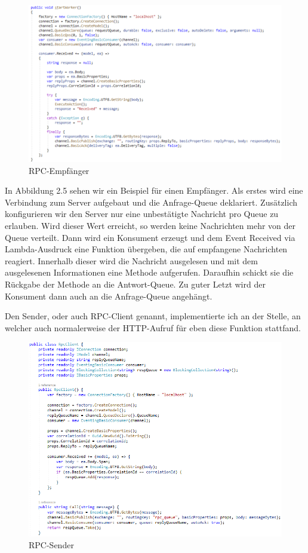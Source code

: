\documentclass[12pt,a4paper]{scrartcl}
\begin{document}
\begin{figure}[h!]
	\centering
	\includegraphics[scale=0.6]{RPCWorkerWhite.png}
	\caption[Screenshot]{RPC-Empfänger}
\end{figure}

In Abbildung 2.5 sehen wir ein Beispiel für einen Empfänger. Als erstes wird eine Verbindung zum Server aufgebaut und die Anfrage-Queue deklariert. Zusätzlich konfigurieren wir den Server nur eine unbestätigte Nachricht pro Queue zu erlauben. Wird dieser Wert erreicht, so werden keine Nachrichten mehr von der Queue verteilt. Dann wird ein Konsument erzeugt und dem Event Received via Lambda-Ausdruck eine Funktion übergeben, die auf empfangene Nachrichten reagiert. Innerhalb dieser wird die Nachricht ausgelesen und mit dem ausgelesenen Informationen eine Methode aufgerufen. Daraufhin schickt sie die Rückgabe der Methode an die Antwort-Queue. Zu guter Letzt wird der Konsument dann auch an die Anfrage-Queue angehängt.

Den Sender, oder auch RPC-Client genannt, implementierte ich an der Stelle, an welcher auch normalerweise der HTTP-Aufruf für eben diese Funktion stattfand.

\begin{figure}[h!]
	\centering
	\includegraphics[scale=0.7]{RPCKlientWhite.png}
	\caption[Screenshot]{RPC-Sender}
\end{figure}
\end{document}
